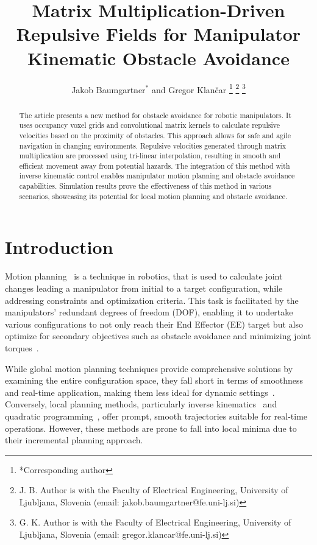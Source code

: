 \documentclass[letterpaper, 10 pt, conference]{ieeeconf}  %
\title{\LARGE \bf
Matrix Multiplication-Driven Repulsive Fields for Manipulator Kinematic Obstacle Avoidance
}
\author{
	Jakob Baumgartner$^{*}$ and Gregor Klančar%
\thanks{*Corresponding author}%
\thanks{J. B. Author is with the Faculty of Electrical Engineering, University of Ljubljana, Slovenia        
         (email: jakob.baumgartner@fe.uni-lj.si)}
\thanks{G. K. Author is with the Faculty of Electrical Engineering, University of Ljubljana, Slovenia        
        (email: gregor.klancar@fe.uni-lj.si)}%
}
\begin{document}
\maketitle
\thispagestyle{empty}
\pagestyle{empty}


\begin{abstract}

The article presents a new method for obstacle avoidance for robotic manipulators. It uses occupancy voxel grids and convolutional matrix kernels to calculate repulsive velocities based on the proximity of obstacles. This approach allows for safe and agile navigation in changing environments. Repulsive velocities generated through matrix multiplication are processed using tri-linear interpolation, resulting in smooth and efficient movement away from potential hazards. The integration of this method with inverse kinematic control enables manipulator motion planning and obstacle avoidance capabilities. Simulation results prove the effectiveness of this method in various scenarios, showcasing its potential for local motion planning and obstacle avoidance.

\end{abstract}

\section{Introduction}

Motion planning~\cite{c52} is a technique in robotics, that is used to calculate joint changes leading a manipulator from initial to a target configuration, while addressing constraints and optimization criteria. This task is facilitated by the manipulators' redundant degrees of freedom (DOF), enabling it to undertake various configurations to not only reach their End Effector (EE) target but also optimize for secondary objectives such as obstacle avoidance and minimizing joint torques~\cite{c30}.

While global motion planning techniques provide comprehensive solutions by examining the entire configuration space, they fall short in terms of smoothness and real-time application, making them less ideal for dynamic settings~\cite{c52}. Conversely, local planning methods, particularly inverse kinematics~\cite{c38} and quadratic programming~\cite{c21,c23, haviland2021neo}, offer prompt, smooth trajectories suitable for real-time operations. However, these methods are prone to fall into local minima due to their incremental planning approach.
\end{document}

